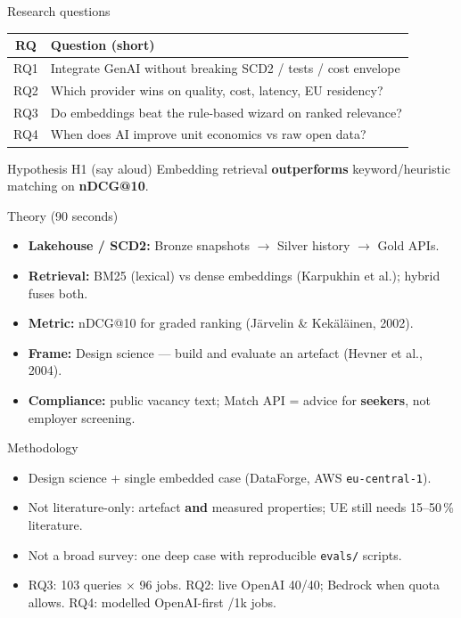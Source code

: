 \documentclass[aspectratio=169,11pt]{beamer}
\begin{document}
\begin{frame}{Research questions}
  \small
  \begin{tabular}{@{}cl@{}}
    \toprule
    \textbf{RQ} & \textbf{Question (short)} \\
    \midrule
    RQ1 & Integrate GenAI without breaking SCD2 / tests / cost envelope \\
    RQ2 & Which provider wins on quality, cost, latency, EU residency? \\
    RQ3 & Do embeddings beat the rule-based wizard on ranked relevance? \\
    RQ4 & When does AI improve unit economics vs raw open data? \\
    \bottomrule
  \end{tabular}
  \vspace{0.5em}
  \begin{block}{Hypothesis H1 (say aloud)}
    Embedding retrieval \textbf{outperforms} keyword/heuristic matching on \textbf{nDCG@10}.
  \end{block}
\end{frame}

\begin{frame}{Theory (90 seconds)}
  \begin{itemize}
    \item \textbf{Lakehouse / SCD2:} Bronze snapshots $\rightarrow$ Silver history $\rightarrow$ Gold APIs.
    \item \textbf{Retrieval:} BM25 (lexical) vs dense embeddings (Karpukhin et al.); hybrid fuses both.
    \item \textbf{Metric:} nDCG@10 for graded ranking (J\"arvelin \& Kek\"al\"ainen, 2002).
    \item \textbf{Frame:} Design science --- build and evaluate an artefact (Hevner et al., 2004).
    \item \textbf{Compliance:} public vacancy text; Match API = advice for \textbf{seekers}, not employer screening.
  \end{itemize}
\end{frame}

\begin{frame}{Methodology}
  \begin{itemize}
    \item Design science + single embedded case (DataForge, AWS \texttt{eu-central-1}).
    \item Not literature-only: artefact \textbf{and} measured properties; UE still needs 15--50\,\% literature.
    \item Not a broad survey: one deep case with reproducible \texttt{evals/} scripts.
    \item RQ3: 103 queries $\times$ 96 jobs. RQ2: live OpenAI 40/40; Bedrock when quota allows. RQ4: modelled OpenAI-first \EUR/1k jobs.
  \end{itemize}
\end{frame}
\end{document}

